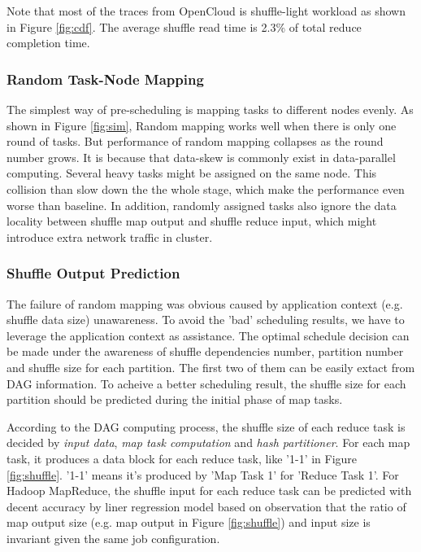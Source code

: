 Note that most of the traces from OpenCloud is shuffle-light workload as shown in Figure \ref{fig:cdf}. The average shuffle read time is 2.3\% of total reduce completion time.

\subsubsection{Random Task-Node Mapping}\label{randomassign}
The simplest way of pre-scheduling is mapping tasks to different nodes evenly.  As shown in Figure \ref{fig:sim}, Random mapping works well when there is only one round of tasks. But performance of random mapping collapses as the round number grows. It is because that data-skew is commonly exist in data-parallel computing\cite{skewtune, reining, gufler2012load}. Several heavy tasks might be assigned on the same node. This collision than slow down the the whole stage, which make the performance even worse than baseline. In addition, randomly assigned tasks also ignore the data locality between shuffle map output and shuffle reduce input, which might introduce extra network traffic in cluster. 


\subsubsection{Shuffle Output Prediction}\label{shuffleprediction}
The failure of random mapping was obvious caused by application context (e.g. shuffle data size) unawareness. To avoid the 'bad' scheduling results, we have to leverage the application context as assistance. The optimal schedule decision can be made under the awareness of shuffle dependencies number, partition number and shuffle size for each partition. The first two of them can be easily extact from DAG information. To acheive a better scheduling result, the shuffle size for each partition should be predicted during the initial phase of map tasks.

According to the DAG computing process, the shuffle size of each reduce task is decided by \textit{input data}, \textit{map task computation} and \textit{hash partitioner}. For each map task, it produces a data block for each reduce task, like '1-1' in Figure \ref{fig:shuffle}. '1-1' means it's produced by 'Map Task 1' for 'Reduce Task 1'. For Hadoop MapReduce, the shuffle input for each reduce task can be predicted with decent accuracy\cite{ishuffle} by liner regression model based on observation that the ratio of map output size (e.g. map output in Figure \ref{fig:shuffle}) and input size is invariant given the same job configuration\cite{predict}. 

